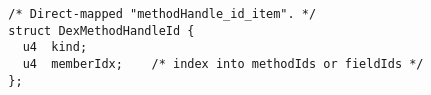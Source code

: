 {\scriptsize \begin{verbatim}
  /* Direct-mapped "methodHandle_id_item". */
  struct DexMethodHandleId {
    u4  kind;
    u4  memberIdx;    /* index into methodIds or fieldIds */
  };
\end{verbatim} }
